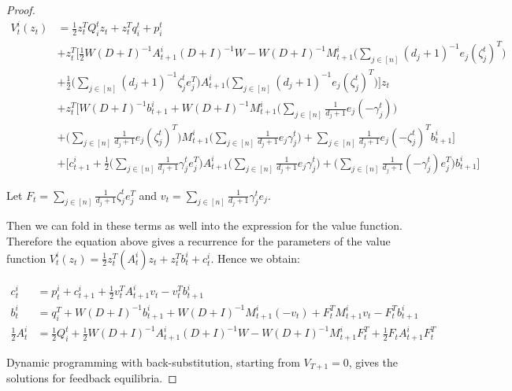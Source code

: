 \begin{proof}
\begin{align*}
V_t^i(z_t) &= 
\frac 1 2 z_t^T Q_i^t z_t + z_t^T q_i^t + p_i^t \\
&+ z_t^T
\bigg[
\frac 1 2 W (D + I)^{-1} A_{t+1}^i (D + I)^{-1} W
- W (D + I)^{-1} M_{t+1}^i 
\bigg(\sum_{j \in [n]} (d_j + 1)^{-1} e_j (\zeta_j^t)^T \bigg) \\
&+ \frac 1 2  
\bigg(\sum_{j \in [n]} (d_j + 1)^{-1} \zeta_j^t e_j^T \bigg)
A_{t+1}^i 
\bigg(\sum_{j \in [n]} (d_j + 1)^{-1} e_j (\zeta_j^t)^T \bigg)
\bigg] z_t \\
&+ z_t^T 
\bigg[
W (D + I)^{-1} b_{t+1}^i + W (D + I)^{-1} M_{t+1}^i 
\bigg(\sum_{j \in [n]} \frac{1}{d_j + 1} e_j (-\gamma_j^t) \bigg)\\
&+ \bigg(\sum_{j \in [n]} \frac{1}{d_j + 1} e_j (\zeta_j^t)^T \bigg)
M_{t+1}^i
\bigg(\sum_{j \in [n]} \frac{1}{d_j + 1} e_j \gamma_j^t \bigg)
+ \sum_{j \in [n]} \frac{1}{d_j + 1} e_j (-\zeta_j^t)^T b_{t+1}^i 
\bigg] \\
&+ 
\bigg[
c_{t+1}^i 
+ \frac 1 2 \bigg(\sum_{j \in [n]} \frac{1}{d_j + 1} \gamma_j^t e_j^T \bigg)
A_{t+1}^i 
\bigg(\sum_{j \in [n]} \frac{1}{d_j + 1} e_j \gamma_j^t \bigg)
+ \bigg(\sum_{j \in [n]} \frac{1}{d_j + 1} (- \gamma_j^t) e_j^T \bigg) b_{t+1}^i
\bigg]
\end{align*}

Let $F_t = \sum_{j \in [n]} \frac{1}{d_j + 1} \zeta_j^t e_j^T$ and $v_t = \sum_{j \in [n]} \frac{1}{d_j + 1} \gamma_j^t e_j$. 

Then we can fold in these terms as well into the expression for the value function. Therefore the equation above gives a recurrence for the parameters of the value function $V_t^i(z_t) = \frac 1 2 z_t^T (A_t^i) z_t + z_t^T b_t^i + c_t^i$. Hence we obtain: 

\begin{align*}
c_t^i &= p_t^i + c_{t+1}^i 
+ \frac 1 2 v_t^T
A_{t+1}^i 
v_t
- v_t^T b_{t+1}^i \\
b_t^i &= q_i^T + W(D+I)^{-1} b_{t+1}^i 
+ W(D+I)^{-1} M_{t+1}^i (-v_t)
+ F_t^T M_{t+1}^i v_t - F_t^T b_{t+1}^i \\
\frac 1 2 A_t^i &= \frac 1 2 Q_i^t + \frac 1 2 W (D + I)^{-1} A_{t+1}^i (D+I)^{-1} W 
- W (D+I)^{-1} M_{t+1}^i F_t^T 
+ \frac 1 2 F_t A_{t+1}^i F_t^T
\end{align*}

Dynamic programming with back-substitution, starting from $V_{T + 1} = 0$, gives the solutions for feedback equilibria. 
\end{proof}

